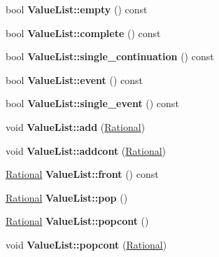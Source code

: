\begin{DoxyCompactItemize}
\mbox{\label{group__output_ga7510db734db466464100413728db233c}} 
bool {\bfseries Value\+List\+::empty} () const
\item 
\mbox{\label{group__output_ga2ebf6a43ad145e4593cc961a4016f330}} 
bool {\bfseries Value\+List\+::complete} () const
\item 
\mbox{\label{group__output_ga9d68ca01f81000f92f1c8911cbd414da}} 
bool {\bfseries Value\+List\+::single\+\_\+continuation} () const
\item 
\mbox{\label{group__output_gaff6e5912f71832597303efe0093d5d00}} 
bool {\bfseries Value\+List\+::event} () const
\item 
\mbox{\label{group__output_ga699183ea1d3babeb7c2c094e31e7070f}} 
bool {\bfseries Value\+List\+::single\+\_\+event} () const
\item 
\mbox{\label{group__output_ga9078b4e45f9864eec53bbfa68d7709d0}} 
void {\bfseries Value\+List\+::add} (\mbox{\hyperlink{classRational}{Rational}})
\item 
\mbox{\label{group__output_gaeb6d26ee1813f879c07148df644a5321}} 
void {\bfseries Value\+List\+::addcont} (\mbox{\hyperlink{classRational}{Rational}})
\item 
\mbox{\label{group__output_ga282fe7cbc28917f2b096d2183419a30c}} 
\mbox{\hyperlink{classRational}{Rational}} {\bfseries Value\+List\+::front} () const
\item 
\mbox{\label{group__output_ga9d5ccdd934a0715c597650fd8cd8d5ed}} 
\mbox{\hyperlink{classRational}{Rational}} {\bfseries Value\+List\+::pop} ()
\item 
\mbox{\label{group__output_ga77bf4e64e28ee7a3bd2989ffe25f7fc9}} 
\mbox{\hyperlink{classRational}{Rational}} {\bfseries Value\+List\+::popcont} ()
\item 
\mbox{\label{group__output_ga7802d98c6ad4e622847be23fbaa6cbea}} 
void {\bfseries Value\+List\+::popcont} (\mbox{\hyperlink{classRational}{Rational}})
\end{DoxyCompactItemize}
